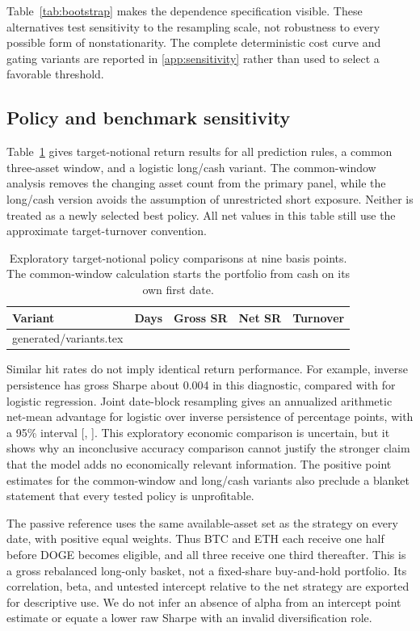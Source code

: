 \documentclass[preprint,12pt,authoryear]{elsarticle}
\makeatletter
\def\inputrows#1{\@@input #1 }
\makeatother
\begin{document}
Table~\ref{tab:bootstrap} makes the dependence specification visible. These alternatives test sensitivity to the resampling scale, not robustness to every possible form of nonstationarity. The complete deterministic cost curve and gating variants are reported in \ref{app:sensitivity} rather than used to select a favorable threshold.

\subsection{Policy and benchmark sensitivity}
Table~\ref{tab:variants} gives target-notional return results for all prediction rules, a common three-asset window, and a logistic long/cash variant. The common-window analysis removes the changing asset count from the primary panel, while the long/cash version avoids the assumption of unrestricted short exposure. Neither is treated as a newly selected best policy. All net values in this table still use the approximate target-turnover convention.

\begin{table}[htbp]\centering\small
\caption{Exploratory target-notional policy comparisons at nine basis points. The common-window calculation starts the portfolio from cash on its own first date.}\label{tab:variants}
\begin{tabular}{lrrrr}\toprule
Variant & Days & Gross SR & Net SR & Turnover\\\midrule
\inputrows{generated/variants.tex}
\bottomrule\end{tabular}\end{table}

Similar hit rates do not imply identical return performance. For example, inverse persistence has gross Sharpe about 0.004 in this diagnostic, compared with \GrossSharpe{} for logistic regression. Joint date-block resampling gives an annualized arithmetic net-mean advantage for logistic over inverse persistence of \EconomicDifference{} percentage points, with a 95\% interval [\EconomicLow, \EconomicHigh]. This exploratory economic comparison is uncertain, but it shows why an inconclusive accuracy comparison cannot justify the stronger claim that the model adds no economically relevant information. The positive point estimates for the common-window and long/cash variants also preclude a blanket statement that every tested policy is unprofitable.

The passive reference uses the same available-asset set as the strategy on every date, with positive equal weights. Thus BTC and ETH each receive one half before DOGE becomes eligible, and all three receive one third thereafter. This is a gross rebalanced long-only basket, not a fixed-share buy-and-hold portfolio. Its correlation, beta, and untested intercept relative to the net strategy are exported for descriptive use. We do not infer an absence of alpha from an intercept point estimate or equate a lower raw Sharpe with an invalid diversification role.
\end{document}
